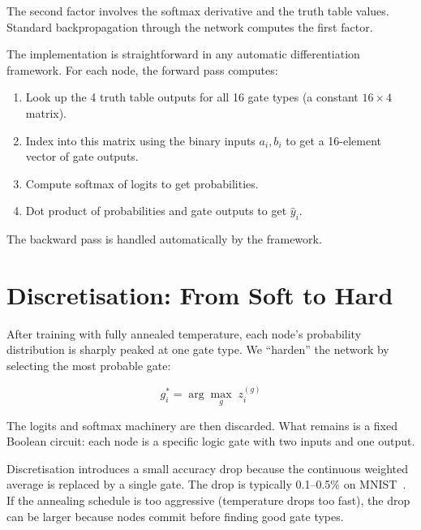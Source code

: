 The second factor involves the softmax derivative and the truth table
values. Standard backpropagation through the network computes the
first factor.

\begin{engineernote}
The implementation is straightforward in any automatic differentiation
framework. For each node, the forward pass computes:
\begin{enumerate}
  \item Look up the 4 truth table outputs for all 16 gate types (a
    constant $16 \times 4$ matrix).
  \item Index into this matrix using the binary inputs $a_i, b_i$ to
    get a 16-element vector of gate outputs.
  \item Compute softmax of logits to get probabilities.
  \item Dot product of probabilities and gate outputs to get
    $\hat{y}_i$.
\end{enumerate}
The backward pass is handled automatically by the framework.
\end{engineernote}


\section{Discretisation: From Soft to Hard}
\label{sec:discretisation}

After training with fully annealed temperature, each node's
probability distribution is sharply peaked at one gate type. We
``harden'' the network by selecting the most probable gate:

\begin{equation}
  g_i^* = \arg\max_g \; z_i^{(g)}
  \label{eq:hardening}
\end{equation}

The logits and softmax machinery are then discarded. What remains is
a fixed Boolean circuit: each node is a specific logic gate with two
inputs and one output.

\begin{warning}
Discretisation introduces a small accuracy drop because the
continuous weighted average is replaced by a single gate. The drop
is typically 0.1--0.5\% on MNIST~\cite{petersen2024difflogic}. If the annealing schedule is too
aggressive (temperature drops too fast), the drop can be larger
because nodes commit before finding good gate types.
\end{warning}


